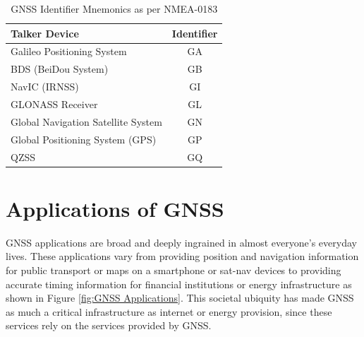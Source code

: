 \renewcommand{\arraystretch}{1.5}
\begin{table}
    \begin{center}
        \caption{GNSS Identifier Mnemonics as per NMEA-0183 \cite{RN71}}
        \label{tab:NMEA Mnemonics}
        \begin{tabular}{ l|c }
            \hline
            \textbf{Talker Device} & \textbf{Identifier} \\
            \hline
            Galileo Positioning System & GA \\
            BDS (BeiDou System) & GB \\
            NavIC (IRNSS) & GI \\
            GLONASS Receiver & GL \\
            Global Navigation Satellite System & GN \\
            Global Positioning System (GPS) & GP \\
            QZSS & GQ \\
            \hline
        \end{tabular}
    \end{center}
\end{table}
\renewcommand{\arraystretch}{1}


\section{Applications of GNSS} \label{sec:ApplicationsGNSS}
GNSS applications are broad and deeply ingrained in almost everyone's everyday lives. These applications vary from providing position and navigation information for public
transport or maps on a smartphone or sat-nav devices to providing accurate timing information for financial institutions or energy infrastructure \cite{RN33} \cite{RN12}
as shown in Figure \ref{fig:GNSS Applications}. This societal ubiquity has made GNSS as much a critical infrastructure as internet or energy provision, since these
services rely on the services provided by GNSS.


